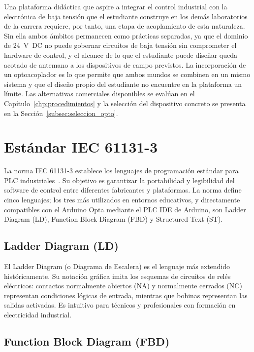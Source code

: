 \documentclass[12pt,a4paper,oneside]{report}
\begin{document}
Una plataforma didáctica que aspire a integrar el control industrial con la electrónica de baja tensión que el estudiante construye en los demás laboratorios de la carrera requiere, por tanto, una etapa de acoplamiento de esta naturaleza. Sin ella ambos ámbitos permanecen como prácticas separadas, ya que el dominio de 24~V~DC no puede gobernar circuitos de baja tensión sin comprometer el hardware de control, y el alcance de lo que el estudiante puede diseñar queda acotado de antemano a los dispositivos de campo previstos. La incorporación de un optoacoplador es lo que permite que ambos mundos se combinen en un mismo sistema y que el diseño propio del estudiante no encuentre en la plataforma un límite. Las alternativas comerciales disponibles se evalúan en el Capítulo~\ref{chp:procedimientos} y la selección del dispositivo concreto se presenta en la Sección~\ref{subsec:seleccion_opto}.

\section{Estándar IEC 61131-3}
\label{sec:iec}

La norma IEC 61131-3 establece los lenguajes de programación estándar para PLC industriales~\cite{ref4}. Su objetivo es garantizar la portabilidad y legibilidad del software de control entre diferentes fabricantes y plataformas. La norma define cinco lenguajes; los tres más utilizados en entornos educativos, y directamente compatibles con el Arduino Opta mediante el PLC IDE de Arduino, son Ladder Diagram (LD), Function Block Diagram (FBD) y Structured Text (ST).

\subsection{Ladder Diagram (LD)}

El Ladder Diagram (o Diagrama de Escalera) es el lenguaje más extendido históricamente. Su notación gráfica imita los esquemas de circuitos de relés eléctricos: contactos normalmente abiertos (NA) y normalmente cerrados (NC) representan condiciones lógicas de entrada, mientras que bobinas representan las salidas activadas. Es intuitivo para técnicos y profesionales con formación en electricidad industrial.

\subsection{Function Block Diagram (FBD)}
\end{document}
